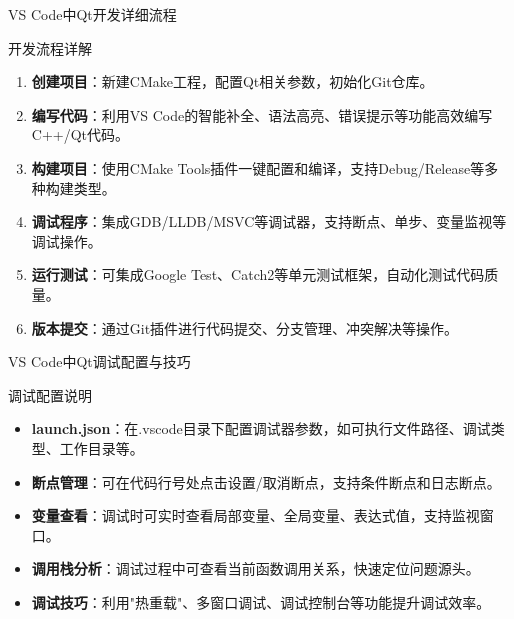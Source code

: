 \documentclass[UTF8,aspectratio=169]{beamer}
\begin{document}
\begin{frame}{VS Code中Qt开发详细流程}
    \begin{ytublock}{开发流程详解}
        \begin{enumerate}
            \item \textbf{创建项目}：新建CMake工程，配置Qt相关参数，初始化Git仓库。
            \item \textbf{编写代码}：利用VS Code的智能补全、语法高亮、错误提示等功能高效编写C++/Qt代码。
            \item \textbf{构建项目}：使用CMake Tools插件一键配置和编译，支持Debug/Release等多种构建类型。
            \item \textbf{调试程序}：集成GDB/LLDB/MSVC等调试器，支持断点、单步、变量监视等调试操作。
            \item \textbf{运行测试}：可集成Google Test、Catch2等单元测试框架，自动化测试代码质量。
            \item \textbf{版本提交}：通过Git插件进行代码提交、分支管理、冲突解决等操作。
        \end{enumerate}
    \end{ytublock}
\end{frame}

\begin{frame}{VS Code中Qt调试配置与技巧}
    \begin{ytublock}{调试配置说明}
        \begin{itemize}
            \item \textbf{launch.json}：在.vscode目录下配置调试器参数，如可执行文件路径、调试类型、工作目录等。
            \item \textbf{断点管理}：可在代码行号处点击设置/取消断点，支持条件断点和日志断点。
            \item \textbf{变量查看}：调试时可实时查看局部变量、全局变量、表达式值，支持监视窗口。
            \item \textbf{调用栈分析}：调试过程中可查看当前函数调用关系，快速定位问题源头。
            \item \textbf{调试技巧}：利用"热重载"、多窗口调试、调试控制台等功能提升调试效率。
        \end{itemize}
    \end{ytublock}
\end{frame}
\end{document}
